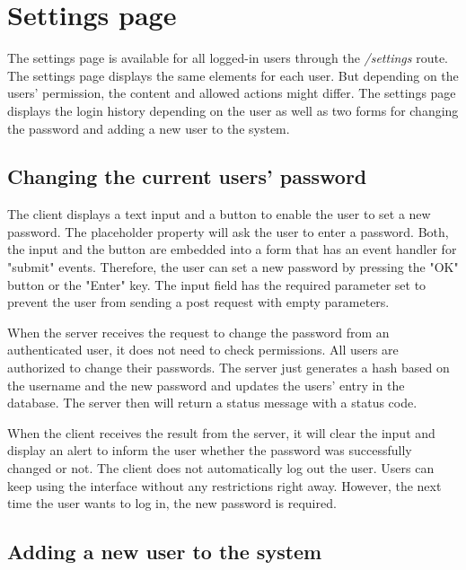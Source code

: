 \section{Settings page}
\label{sec:settings_page}

The settings page is available for all logged-in users through the \textit{/settings} route. The settings page displays the same elements for each user. But depending on the users' permission, the content and allowed actions might differ. The settings page displays the login history depending on the user as well as two forms for changing the password and adding a new user to the system.



\subsection{Changing the current users' password}
\label{subsec:changing_the_current_users_password}

The client displays a text input and a button to enable the user to set a new password. The placeholder property will ask the user to enter a password. Both, the input and the button are embedded into a form that has an event handler for "submit" events. Therefore, the user can set a new password by pressing the "OK" button or the "Enter" key.  The input field has the required parameter set to prevent the user from sending a post request with empty parameters.

When the server receives the request to change the password from an authenticated user, it does not need to check permissions. All users are authorized to change their passwords. The server just generates a hash based on the username and the new password and updates the users' entry in the database. The server then will return a status message with a status code.

When the client receives the result from the server, it will clear the input and display an alert to inform the user whether the password was successfully changed or not. The client does not automatically log out the user. Users can keep using the interface without any restrictions right away. However, the next time the user wants to log in, the new password is required.



\subsection{Adding a new user to the system}
\label{subsec:adding_a_new_user_to_the_system}


